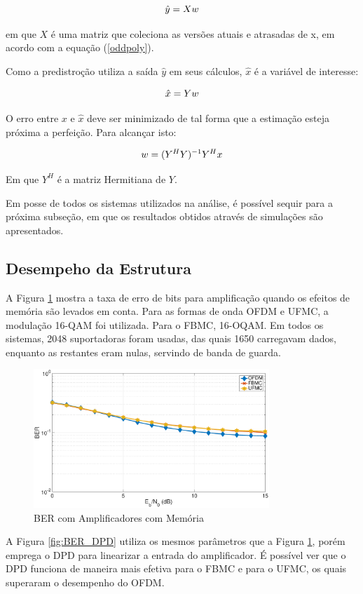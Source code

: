 \begin{equation} 
\label{ampvecq}
\boldmath{\hat{y}} = \boldmath{Xw} 
\end{equation}

em que {$X$} é uma matriz que coleciona as versões atuais e atrasadas de x, em acordo com a equação (\ref{oddpoly}). 

Como a predistroção utiliza a saída $\hat{y}$ em seus cálculos, $\hat{x}$ é a variável de interesse: 

\begin{equation} 
\label{ampvecout}
\boldmath{\hat{x}} = \boldmath{Yw} 
\end{equation}

O erro entre $x$ e $\hat{x}$ deve ser minimizado de tal forma que a estimação esteja próxima a perfeição. Para alcançar isto: 

\begin{equation} 
\label{coef}
\boldmath{w} = \boldmath{(Y^{H}Y)^{-1}Y^{H}x} 
\end{equation}

Em que $Y^{H}$ é a matriz Hermitiana de $Y$. 

Em posse de todos os sistemas utilizados na análise, é possível sequir para a próxima subseção, em que os resultados obtidos através de simulações são apresentados. 

\subsection{Desempeho da Estrutura}

A Figura \ref{fig:non_lin} mostra a taxa de erro de bits para amplificação quando os efeitos de memória são levados em conta. Para as formas de onda OFDM e UFMC, a modulação 16-QAM foi utilizada. Para o FBMC, 16-OQAM. Em todos os sistemas, 2048 suportadoras foram usadas, das quais 1650 carregavam dados, enquanto as restantes eram nulas, servindo de banda de guarda. 

\begin{figure}[h!]
\centering
\includegraphics[width=3.5in]{mem_HPA} 
\caption{BER com Amplificadores com Memória}
\label{fig:non_lin}
\end{figure}
A Figura \ref{fig:BER_DPD} utiliza os mesmos parâmetros que a Figura \ref{fig:non_lin}, porém emprega o DPD para linearizar a entrada do amplificador. É possível ver que o DPD funciona de maneira mais efetiva para o FBMC e para o UFMC, os quais superaram o desempenho do OFDM.

